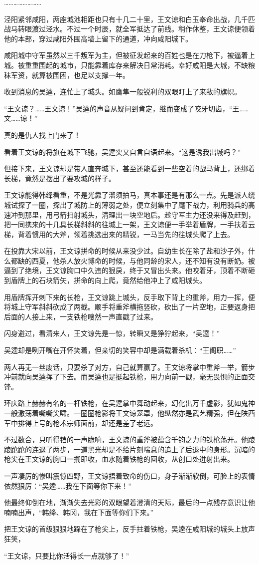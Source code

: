 ……………………

泾阳紧邻咸阳，两座城池相距也只有十几二十里，王文谅和白玉奉命出战，几千匹战马转眼渡过泾水。不过一个时辰，就全军抵达了前线。稍作休整，王文谅便领着他的本部，穿过咸阳外围高墙上留下的通道，冲向咸阳城下。

咸阳城中守军虽然以三千叛军为主，但被征发起来的百姓也是在刀枪下，被逼着上城。被重重围起的城市，只能靠着库存来解决日常消耗。幸好咸阳是大城，不缺粮秣军资，就算被围困，也足以支撑一年。

收到消息的吴逵，连忙上了城头。如鹰隼一般锐利的双眼盯上了来敌的旗帜。

“王文谅？……王文谅！”吴逵的声音从疑问到肯定，继而变成了咬牙切齿，“王……文……谅！”

真的是仇人找上门来了！

看着王文谅的将旗在城下飞驰，吴逵突又自言自语起来。“这是诱我出城吗？”

但接下来，王文谅却是带人直奔城下，甚至还能看到一些空着的战马背上，还绑着长梯，竟然是摆出了要攻城的样子。

王文谅能得韩绛看重，不是光靠了溜须拍马，真本事还是有那么一点。先是派人绕城试探了一圈，探出了城防上的薄弱之处，便立刻集中了麾下战力，利用骑兵的高速冲到那里，用弓箭扫射城头，清理出一块空地后。趁守军主力还没来得及赶到，把一同携来的十几具长梯斜斜的往城上一架，王文谅便一手举着盾牌，一手扶着云梯，背着惯用的大斧，领着挑选出来的精锐，一马当先的往城头爬了上去。

在投靠大宋以前，王文谅拼命的时候从来没少过。自幼生长在除了盐和沙子外，什么都缺的西夏，他杀人放火博命的时候，与他同龄的宋人，还不知有没有断奶。被逼到了绝境，王文谅胸口中久违的狠戾，终于又冒出头来。他咬着牙，顶着不断砸到盾牌上的石块箭矢，拼命的向上爬，竟然给他冲上了咸阳城头。

用盾牌挥开刺下来的长枪，王文谅跳上城头，反手取下背上的重斧，用力一挥，便将城上守军斜斜砍成了两截。顺手将重斧横拖竖砍，砍出了一片空地，正要返身把后面的人接上来，一支铁枪嗖然一声直戳了过来。

闪身避过，看清来人，王文谅先是一惊，转瞬又是狰狞起来，“吴逵！”

吴逵却是咧开嘴在开怀笑着，但亲切的笑容中却是满载着杀机：“王阁职……”

两人再无一丝废话，只要杀了对方，自己就算赢了。王文谅将掌中重斧一举，箭步冲前就向吴逵挥了下去。而吴逵也是挺起铁枪，用力向前一戳，毫无畏惧的正面交锋。

环庆路上赫赫有名的一杆铁枪，在吴逵掌中舞动起来，幻化出万千虚影，犹如鬼神一般激荡着嘶嘶尖啸。一圈圈枪影将王文谅笼罩，他纵然亦是武艺精强，但在陕西军中排得上号的枪术宗师面前，却还是差了老远。

不过数合，只听得铛的一声脆响，王文谅的重斧被蕴含千钧之力的铁枪荡开。他踉踉跄跄的连退了两步，一道黑光却是不给片刻喘息的追上了后退中的身形。沉暗的枪尖在王文谅的胸口一搠即收，血水随着铁枪的回收，从创口处迸射出来。

一声凄厉的惨叫震惊四野，王文谅捂着致命的伤口，身子渐渐软倒，可脸上的表情依然狠厉：“吴逵……我在下面等你下来！”

他最终仰倒在地，渐渐失去光彩的双眼望着澄清的天际，最后的一点残存意识让他喃喃出声，“韩绛、韩冈，我在下面等你们下来。”

把王文谅的首级狠狠地跺在了枪尖上，反手拄着铁枪，吴逵在咸阳城的城头上放声狂笑，

“王文谅，只要比你活得长一点就够了！”

